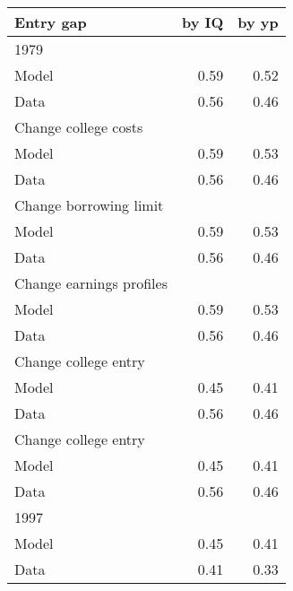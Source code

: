 \begin{tabular}{lrr}
\hline
Entry gap & by IQ  & by yp  \\ 
\hline
1979 &   &   \\ 
Model & 0.59  & 0.52  \\ 
Data & 0.56  & 0.46  \\ 
Change college costs &   &   \\ 
Model & 0.59  & 0.53  \\ 
Data & 0.56  & 0.46  \\ 
Change borrowing limit &   &   \\ 
Model & 0.59  & 0.53  \\ 
Data & 0.56  & 0.46  \\ 
Change earnings profiles &   &   \\ 
Model & 0.59  & 0.53  \\ 
Data & 0.56  & 0.46  \\ 
Change college entry &   &   \\ 
Model & 0.45  & 0.41  \\ 
Data & 0.56  & 0.46  \\ 
Change college entry &   &   \\ 
Model & 0.45  & 0.41  \\ 
Data & 0.56  & 0.46  \\ 
1997 &   &   \\ 
Model & 0.45  & 0.41  \\ 
Data & 0.41  & 0.33  \\ 
\hline
\end{tabular}%
